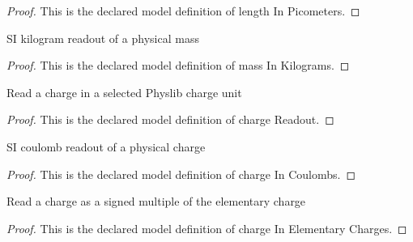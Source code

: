 \begin{proof}
  This is the declared model definition of length In Picometers.
\end{proof}
\begin{definition}
  \label{def:physics:phyx-mini-0535:phyxminiproblems-problemphyxmini0535-massinkilograms}
  SI kilogram readout of a physical mass
\end{definition}
\begin{proof}
  This is the declared model definition of mass In Kilograms.
\end{proof}
\begin{definition}
  \label{def:physics:phyx-mini-0535:phyxminiproblems-problemphyxmini0535-chargereadout}
  Read a charge in a selected Physlib charge unit
\end{definition}
\begin{proof}
  This is the declared model definition of charge Readout.
\end{proof}
\begin{definition}
  \label{def:physics:phyx-mini-0535:phyxminiproblems-problemphyxmini0535-chargeincoulombs}
  SI coulomb readout of a physical charge
\end{definition}
\begin{proof}
  This is the declared model definition of charge In Coulombs.
\end{proof}
\begin{definition}
  \label{def:physics:phyx-mini-0535:phyxminiproblems-problemphyxmini0535-chargeinelementarycharges}
  Read a charge as a signed multiple of the elementary charge
\end{definition}
\begin{proof}
  This is the declared model definition of charge In Elementary Charges.
\end{proof}
